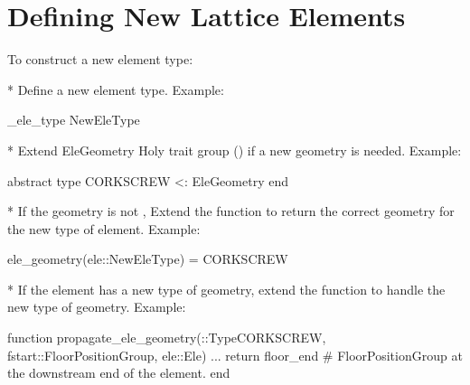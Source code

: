 \chapter{Defining New Lattice Elements}
\label{c:new.ele}

To construct a new element type:

* Define a new element type. Example:
\begin{example}
  \@construct_ele_type NewEleType
\end{example}

* Extend EleGeometry Holy trait group () if a new geometry is needed. Example:
\begin{example}
  abstract type CORKSCREW <: EleGeometry end
\end{example}

* If the geometry is not , Extend the  function to return the 
correct geometry for the new type of element. Example:
\begin{example}
  ele_geometry(ele::NewEleType) = CORKSCREW
\end{example}

* If the element has a new type of geometry, extend the  function
to handle the new type of geometry. Example:
\begin{example}
  function propagate_ele_geometry(::Type{CORKSCREW}, fstart::FloorPositionGroup, ele::Ele)
    ...
    return floor_end  # FloorPositionGroup at the downstream end of the element.
  end
\end{example}